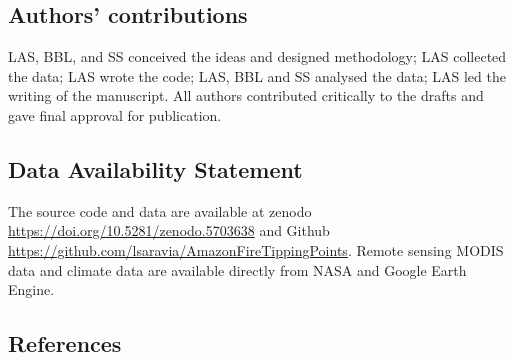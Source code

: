 \documentclass[
]{article}
\begin{document}
\subsection{Authors' contributions}\label{authors-contributions}

LAS, BBL, and SS conceived the ideas and designed methodology; LAS
collected the data; LAS wrote the code; LAS, BBL and SS analysed the
data; LAS led the writing of the manuscript. All authors contributed
critically to the drafts and gave final approval for publication.

\subsection{Data Availability
Statement}\label{data-availability-statement}

The source code and data are available at zenodo
\url{https://doi.org/10.5281/zenodo.5703638} and Github
\url{https://github.com/lsaravia/AmazonFireTippingPoints}. Remote
sensing MODIS data and climate data are available directly from NASA and
Google Earth Engine.

\subsection*{References}\label{references}
\end{document}
